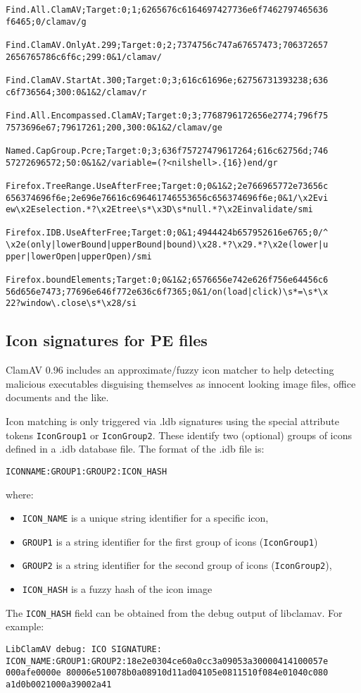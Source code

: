 \documentclass[a4paper,titlepage,12pt]{article}
\begin{document}
    \begin{verbatim}
Find.All.ClamAV;Target:0;1;6265676c6164697427736e6f7462797465636
f6465;0/clamav/g

Find.ClamAV.OnlyAt.299;Target:0;2;7374756c747a67657473;706372657
2656765786c6f6c;299:0&1/clamav/

Find.ClamAV.StartAt.300;Target:0;3;616c61696e;62756731393238;636
c6f736564;300:0&1&2/clamav/r

Find.All.Encompassed.ClamAV;Target:0;3;7768796172656e2774;796f75
7573696e67;79617261;200,300:0&1&2/clamav/ge

Named.CapGroup.Pcre;Target:0;3;636f75727479617264;616c62756d;746
57272696572;50:0&1&2/variable=(?<nilshell>.{16})end/gr

Firefox.TreeRange.UseAfterFree;Target:0;0&1&2;2e766965772e73656c
656374696f6e;2e696e76616c696461746553656c656374696f6e;0&1/\x2Evi
ew\x2Eselection.*?\x2Etree\s*\x3D\s*null.*?\x2Einvalidate/smi

Firefox.IDB.UseAfterFree;Target:0;0&1;4944424b657952616e6765;0/^
\x2e(only|lowerBound|upperBound|bound)\x28.*?\x29.*?\x2e(lower|u
pper|lowerOpen|upperOpen)/smi

Firefox.boundElements;Target:0;0&1&2;6576656e742e626f756e64456c6
56d656e7473;77696e646f772e636c6f7365;0&1/on(load|click)\s*=\s*\x
22?window\.close\s*\x28/si
    \end{verbatim}

    \subsection{Icon signatures for PE files}
    ClamAV 0.96 includes an approximate/fuzzy icon matcher to help
    detecting malicious executables disguising themselves as innocent
    looking image files, office documents and the like.

    Icon matching is only triggered via .ldb signatures using the special
    attribute tokens \verb+IconGroup1+ or \verb+IconGroup2+. These identify
    two (optional) groups of icons defined in a .idb database file. The
    format of the .idb file is:
    \begin{verbatim}
ICONNAME:GROUP1:GROUP2:ICON_HASH
    \end{verbatim}
    where:
    \begin{itemize}
	\item \verb+ICON_NAME+ is a unique string identifier for a specific
	icon,
	\item \verb+GROUP1+ is a string identifier for the first group of
	icons (\verb+IconGroup1+)
	\item \verb+GROUP2+ is a string identifier for the second group of
	icons (\verb+IconGroup2+),
	\item \verb+ICON_HASH+ is a fuzzy hash of the icon image
    \end{itemize}
    The \verb+ICON_HASH+ field can be obtained from the debug output of
    libclamav. For example:
    \begin{verbatim}
LibClamAV debug: ICO SIGNATURE:
ICON_NAME:GROUP1:GROUP2:18e2e0304ce60a0cc3a09053a30000414100057e
000afe0000e 80006e510078b0a08910d11ad04105e0811510f084e01040c080
a1d0b0021000a39002a41
    \end{verbatim}
\end{document}
